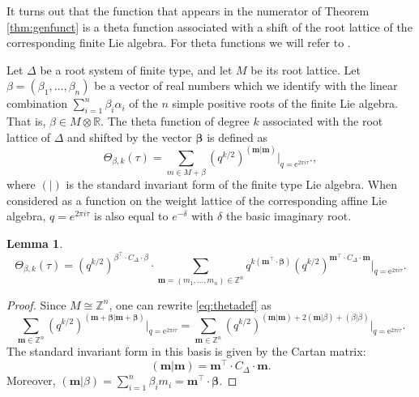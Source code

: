 \documentclass[11pt,a4paper]{amsart}
\newtheorem{lemma}[theorem]{Lemma}
\theoremstyle{definition}
\newcommand{\SZ}{\mathbb{Z}}                    %
\newcommand{\SR}{\mathbb{R}}                    %
\begin{document}
It turns out that the function that appears in the numerator of Theorem \ref{thm:genfunct} is a theta function associated with a shift of the root lattice of the corresponding finite Lie algebra. For theta functions we will refer to
\cite{cohen2017modular}. %


Let $\Delta$ be a root system of finite type, and let $M$ be its root lattice. %
Let $\beta=(\beta_1,\dots,\beta_n)$ be a vector of real numbers which we identify with the linear combination $\sum_{i=1}^n \beta_i \alpha_i$ of the $n$ simple positive roots of the finite Lie algebra. That is, $\beta \in M\otimes \SR$. The theta function of degree $k$
associated with the root lattice of $\Delta$ and 
shifted by the vector $\mathbf{\beta}$ is defined as
\begin{equation}
\Theta_{\beta,k}(\tau)= \sum_{m \in M+\beta} (q^{k/2})^{(\mathbf{m} | \mathbf{m})} \Big|_{q=\mathrm{e}^{2 \pi i \tau}}.
\label{eq:thetadef},
\end{equation}
where $(|)$ is the standard invariant form of the finite type Lie algebra.
When considered as a function on the weight lattice of the corresponding affine Lie algebra, $q=e^{2 \pi i \tau}$ is also equal to $ e^{-\delta}$ with $\delta$ the basic imaginary root. 
\begin{lemma}
\[
\Theta_{\beta,k}(\tau)= (q^{k/2})^{\beta^\top \cdot C_\Delta \cdot \beta} \cdot \sum_{ \mathbf{m}=(m_1,\dots,m_n) \in \SZ^n } q^{ k(\mathbf{m}^\top \cdot \mathbf{\beta}) } (q^{k/2})^{\mathbf{m}^\top \cdot C_\Delta \cdot \mathbf{m}} \Big|_{q=\mathrm{e}^{2 \pi i \tau}}.\]
\label{lem:thetadef2}
\end{lemma}
\begin{proof}
Since $M \cong \SZ^n $, one can rewrite \eqref{eq:thetadef}
as
\[ \sum_{\mathbf{m} \in \SZ^n} (q^{k/2})^{(\mathbf{m+\beta} | \mathbf{m+\beta})} \Big|_{q=\mathrm{e}^{2 \pi i \tau}}=
\sum_{\mathbf{m} \in \SZ^n} (q^{k/2})^{(\mathbf{m}| \mathbf{m})+2(\mathbf{m}|\beta)+(\beta|\beta)} \Big|_{q=\mathrm{e}^{2 \pi i \tau}}
.\]
The standard invariant form in this basis is given by the Cartan matrix:
\[ (\mathbf{m} | \mathbf{m})=\mathbf{m}^\top \cdot C_\Delta \cdot \mathbf{m}.\]
Moreover, $(\mathbf{m}|\beta)=\sum_{i=1}^n \beta_i m_i = \mathbf{m}^\top \cdot \mathbf{\beta}$.
\end{proof}
\end{document}
